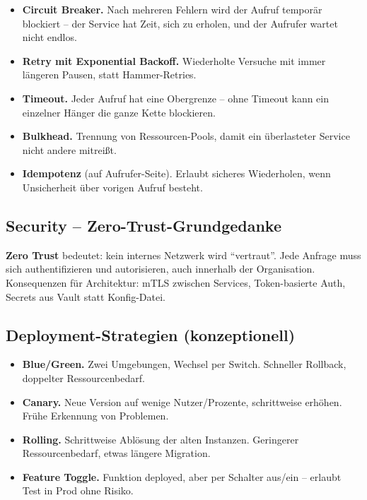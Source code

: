 \documentclass[11pt,a4paper,oneside]{article}
\newcommand{\fachbegriff}[1]{\textbf{#1}}
\begin{document}
\begin{itemize}
  \item \fachbegriff{Circuit Breaker.} Nach mehreren Fehlern wird der Aufruf temporär blockiert -- der Service hat Zeit, sich zu erholen, und der Aufrufer wartet nicht endlos.
  \item \fachbegriff{Retry mit Exponential Backoff.} Wiederholte Versuche mit immer längeren Pausen, statt Hammer-Retries.
  \item \fachbegriff{Timeout.} Jeder Aufruf hat eine Obergrenze -- ohne Timeout kann ein einzelner Hänger die ganze Kette blockieren.
  \item \fachbegriff{Bulkhead.} Trennung von Ressourcen-Pools, damit ein überlasteter Service nicht andere mitreißt.
  \item \fachbegriff{Idempotenz} (auf Aufrufer-Seite). Erlaubt sicheres Wiederholen, wenn Unsicherheit über vorigen Aufruf besteht.
\end{itemize}

\subsection{Security -- Zero-Trust-Grundgedanke}

\fachbegriff{Zero Trust} bedeutet: kein internes Netzwerk wird ``vertraut''. Jede Anfrage muss sich authentifizieren und autorisieren, auch innerhalb der Organisation. Konsequenzen für Architektur: mTLS zwischen Services, Token-basierte Auth, Secrets aus Vault statt Konfig-Datei.

\subsection{Deployment-Strategien (konzeptionell)}

\begin{itemize}
  \item \fachbegriff{Blue/Green.} Zwei Umgebungen, Wechsel per Switch. Schneller Rollback, doppelter Ressourcenbedarf.
  \item \fachbegriff{Canary.} Neue Version auf wenige Nutzer/Prozente, schrittweise erhöhen. Frühe Erkennung von Problemen.
  \item \fachbegriff{Rolling.} Schrittweise Ablösung der alten Instanzen. Geringerer Ressourcenbedarf, etwas längere Migration.
  \item \fachbegriff{Feature Toggle.} Funktion deployed, aber per Schalter aus/ein -- erlaubt Test in Prod ohne Risiko.
\end{itemize}
\end{document}

